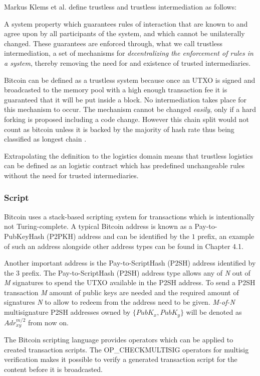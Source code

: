 Markus Klems et al. define trustless and trustless intermediation as follows:

\begin{displayquote}
   A system property which guarantees rules of interaction that are known to and agree upon by all participants of the system, and which cannot be unilaterally changed. These guarantees are enforced through, what we call trustless intermediation, a set of mechanisms for \textit{decentralizing the enforcement of rules in a system}, thereby removing the need for and existence of trusted intermediaries. \cite{trustlessIntermediationInBCServiceMarket}
\end{displayquote}

Bitcoin can be defined as a trustless system because once an UTXO is signed and broadcasted to the memory pool with a high enough transaction fee it is guaranteed that it will be put inside a block. No intermediation takes place for this mechanism to occur. The mechanism cannot be changed \textit{easily}, only if a hard forking is proposed including a code change. However this chain split would not count as bitcoin unless it is backed by the majority of hash rate thus being classified as longest chain \cite{nakamoto2008bitcoin}. \par
Extrapolating the definition to the logistics domain means that trustless logistics can be defined as an logistic contract which has predefined unchangeable rules without the need for trusted intermediaries.

\subsubsection{Script}

Bitcoin uses a stack-based scripting system for transactions which is intentionally not Turing-complete. A typical Bitcoin address is known as a Pay-to-PubKeyHash (P2PKH) address and can be identified by the $1$ prefix, an example of such an address alongside other address types can be found in Chapter 4.1. \par
Another important address is the Pay-to-ScriptHash (P2SH) address identified by the $3$ prefix. The Pay-to-ScriptHash (P2SH) address type allows any of \textit{N} out of \textit{M} signatures to spend the UTXO available in the P2SH address. To send a P2SH transaction \textit{M} amount of public keys are needed and the required amount of signatures \textit{N} to allow to redeem from the address need to be given. \textit{M-of-N} multisignature P2SH addresses owned by $\{PubK_x, PubK_y\}$ will be denoted as \(Adr_{xy}^{m/2}\) from now on. \par
The Bitcoin scripting language provides operators which can be applied to created transaction scripts. The OP\_CHECKMULTISIG operators for multisig verification makes it possible to verify a generated transaction script for the content before it is broadcasted. \par


